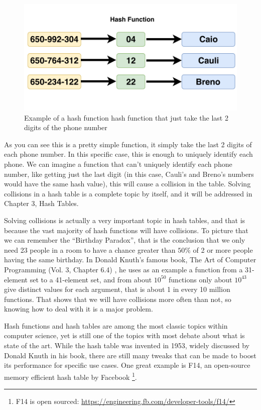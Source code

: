 \bigskip

\begin{figure}[h!]
  \centering
  \includegraphics[width=12cm]{figuras/phone-hash-example.pdf}
  \caption{Example of a hash function hash function that just take the last 2 digits of the phone number }
\end{figure}

\medskip

As you can see this is a pretty simple function, it simply take the last 2 digits of each phone number. In this specific case, this is enough to uniquely identify each phone. We can imagine a function that can't uniquely identify each phone number, like getting just the last digit (in this case, Cauli's and Breno's numbers would have the same hash value), this will cause a collision in the table. Solving collisions in a hash table is a complete topic by itself, and it will be addressed in Chapter 3, Hash Tables. 

Solving collisions is actually a very important topic in hash tables, and that is because the vast majority of hash functions will have collisions. To picture that we can remember the ``Birthday Paradox'', that is the conclusion that we only need 23 people in a room to have a chance greater than \( 50\% \) of 2 or more people having the same birthday. In Donald Knuth's famous book, The Art of Computer Programming (Vol. 3, Chapter 6.4) \cite{TAOCP3}, he uses as an example a function from a 31-element set to a 41-element set, and from about \( 10^{50} \) functions only about \( 10^{43} \) give distinct values for each argument, that is about 1 in every 10 million functions. That shows that we will have collisions more often than not, so knowing how to deal with it is a major problem.

Hash functions and hash tables are among the most classic topics within computer science, yet is still one of the topics with most debate about what is state of the art. While the hash table was invented in 1953, widely discussed by Donald Knuth in his book, there are still many tweaks that can be made to boost its performance for specific use cases. One great example is F14, an open-source memory efficient hash table by Facebook \footnote{F14 is open sourced: \url{https://engineering.fb.com/developer-tools/f14/}}.


